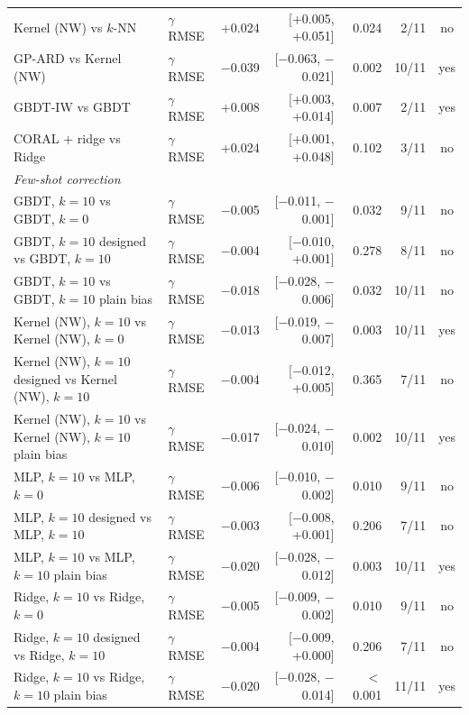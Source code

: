 \begin{tabular}{llrrrrc}
Kernel (NW) vs $k$-NN & $\gamma$ RMSE & +0.024 & [+0.005, +0.051] & 0.024 & 2/11 & no \\
GP-ARD vs Kernel (NW) & $\gamma$ RMSE & \ensuremath{-}0.039 & [\ensuremath{-}0.063, \ensuremath{-}0.021] & 0.002 & 10/11 & yes \\
GBDT-IW vs GBDT & $\gamma$ RMSE & +0.008 & [+0.003, +0.014] & 0.007 & 2/11 & yes \\
CORAL + ridge vs Ridge & $\gamma$ RMSE & +0.024 & [+0.001, +0.048] & 0.102 & 3/11 & no \\
\multicolumn{7}{l}{\emph{Few-shot correction}} \\
GBDT, $k{=}10$ vs GBDT, $k{=}0$ & $\gamma$ RMSE & \ensuremath{-}0.005 & [\ensuremath{-}0.011, \ensuremath{-}0.001] & 0.032 & 9/11 & no \\
GBDT, $k{=}10$ designed vs GBDT, $k{=}10$ & $\gamma$ RMSE & \ensuremath{-}0.004 & [\ensuremath{-}0.010, +0.001] & 0.278 & 8/11 & no \\
GBDT, $k{=}10$ vs GBDT, $k{=}10$ plain bias & $\gamma$ RMSE & \ensuremath{-}0.018 & [\ensuremath{-}0.028, \ensuremath{-}0.006] & 0.032 & 10/11 & no \\
Kernel (NW), $k{=}10$ vs Kernel (NW), $k{=}0$ & $\gamma$ RMSE & \ensuremath{-}0.013 & [\ensuremath{-}0.019, \ensuremath{-}0.007] & 0.003 & 10/11 & yes \\
Kernel (NW), $k{=}10$ designed vs Kernel (NW), $k{=}10$ & $\gamma$ RMSE & \ensuremath{-}0.004 & [\ensuremath{-}0.012, +0.005] & 0.365 & 7/11 & no \\
Kernel (NW), $k{=}10$ vs Kernel (NW), $k{=}10$ plain bias & $\gamma$ RMSE & \ensuremath{-}0.017 & [\ensuremath{-}0.024, \ensuremath{-}0.010] & 0.002 & 10/11 & yes \\
MLP, $k{=}10$ vs MLP, $k{=}0$ & $\gamma$ RMSE & \ensuremath{-}0.006 & [\ensuremath{-}0.010, \ensuremath{-}0.002] & 0.010 & 9/11 & no \\
MLP, $k{=}10$ designed vs MLP, $k{=}10$ & $\gamma$ RMSE & \ensuremath{-}0.003 & [\ensuremath{-}0.008, +0.001] & 0.206 & 7/11 & no \\
MLP, $k{=}10$ vs MLP, $k{=}10$ plain bias & $\gamma$ RMSE & \ensuremath{-}0.020 & [\ensuremath{-}0.028, \ensuremath{-}0.012] & 0.003 & 10/11 & yes \\
Ridge, $k{=}10$ vs Ridge, $k{=}0$ & $\gamma$ RMSE & \ensuremath{-}0.005 & [\ensuremath{-}0.009, \ensuremath{-}0.002] & 0.010 & 9/11 & no \\
Ridge, $k{=}10$ designed vs Ridge, $k{=}10$ & $\gamma$ RMSE & \ensuremath{-}0.004 & [\ensuremath{-}0.009, +0.000] & 0.206 & 7/11 & no \\
Ridge, $k{=}10$ vs Ridge, $k{=}10$ plain bias & $\gamma$ RMSE & \ensuremath{-}0.020 & [\ensuremath{-}0.028, \ensuremath{-}0.014] & $<$0.001 & 11/11 & yes \\
\bottomrule
\end{tabular}
